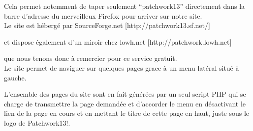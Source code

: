 \documentclass[14pt,a4paper]{report}
\begin{document}
Cela permet notemment de taper seulement ``patchwork13''
directement dans la barre d'adresse du merveilleux Firefox pour
arriver sur notre site. \\

Le site est h\'eberg\'e par SourceForge.net [http://patchwork13.sf.net/]

et dispose \'egalement d'un miroir chez lowh.net [http://patchwork.lowh.net]

que nous tenons donc \`a remercier pour ce service gratuit. \\

Le site permet de naviguer sur quelques pages grace \`a un menu lat\'eral
situ\'e \`a gauche.

L'ensemble des pages du site sont en fait g\'en\'er\'ees par un
seul script PHP qui se charge de transmettre la page demand\'ee et
d'accorder le menu en d\'esactivant le lien de la page en cours et
en mettant le titre de cette page en haut, juste sous le logo de
Patchwork13!. \\
\end{document}
